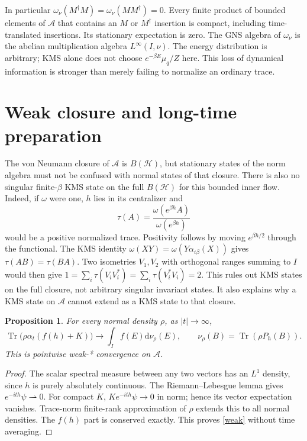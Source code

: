 \documentclass[11pt]{article}
\newcommand{\HH}{\mathcal H}
\newcommand{\Alg}{\mathcal A}
\newcommand{\Tr}{\operatorname{Tr}}
\newcommand{\dd}{\mathrm d}
\newtheorem{proposition}{Proposition}
\begin{document}
In particular $\omega_\nu(M^\dagger M)=\omega_\nu(MM^\dagger)=0$.
Every finite product of bounded elements of $\Alg$ that contains
an $M$ or $M^\dagger$ insertion is compact, including time-translated
insertions. Its stationary expectation is zero. The GNS algebra
of $\omega_\nu$ is the abelian multiplication algebra $L^\infty(I,\nu)$.
The energy distribution is arbitrary; KMS alone does not choose
$e^{-\beta E}\mu_q/Z$ here. This loss of dynamical information
is stronger than merely failing to normalize an ordinary trace.

\newpage
\section{Weak closure and long-time preparation}
The von Neumann closure of $\Alg$ is $B(\HH)$, but stationary
states of the norm algebra must not be confused with normal states
of that closure. There is also no singular finite-$\beta$ KMS
state on the full $B(\HH)$ for this bounded inner flow.
Indeed, if $\omega$ were one, $h$ lies in its centralizer and
\begin{equation}
 \tau(A)=\frac{\omega(e^{\beta h}A)}{\omega(e^{\beta h})}
\end{equation}
would be a positive normalized trace. Positivity follows by moving
$e^{\beta h/2}$ through the functional. The KMS identity
$\omega(XY)=\omega(Y\alpha_{i\beta}(X))$ gives
$\tau(AB)=\tau(BA)$. Two isometries $V_1,V_2$ with orthogonal
ranges summing to $I$ would then give
$1=\sum_i\tau(V_iV_i^*)=\sum_i\tau(V_i^*V_i)=2$.
This rules out KMS states on the full closure, not arbitrary
singular invariant states. It also explains why a KMS state
on $\Alg$ cannot extend as a KMS state to that closure.

\begin{proposition}\label{limit}
For every normal density $\rho$, as $|t|\to\infty$,
\begin{equation}\label{weak}
 \Tr\bigl(\rho\alpha_t(f(h)+K)\bigr)
 \longrightarrow \int_I f(E)\dd\nu_\rho(E),\qquad
 \nu_\rho(B)=\Tr(\rho P_h(B)).
\end{equation}
This is pointwise weak-* convergence on $\Alg$.
\end{proposition}
\begin{proof}
The scalar spectral measure between any two vectors has an
$L^1$ density, since $h$ is purely absolutely continuous.
The Riemann--Lebesgue lemma gives $e^{-ith}\psi\rightharpoonup0$.
For compact $K$, $K e^{-ith}\psi\to0$ in norm; hence its vector
expectation vanishes. Trace-norm finite-rank approximation of
$\rho$ extends this to all normal densities. The $f(h)$ part
is conserved exactly. This proves \eqref{weak} without time averaging.
\end{proof}
\end{document}
